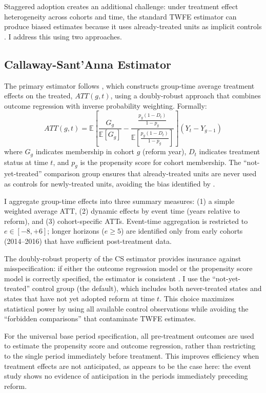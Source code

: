\documentclass[12pt]{article}
\newcommand{\E}{\mathbb{E}}
\begin{document}
Staggered adoption creates an additional challenge: under treatment effect heterogeneity across cohorts and time, the standard TWFE estimator can produce biased estimates because it uses already-treated units as implicit controls \citep{goodman2021difference, dechaisemartin2020twoway, sun2021estimating, roth2023pretrends}. I address this using two approaches.

\subsection{Callaway-Sant'Anna Estimator}

The primary estimator follows \citet{callaway2021difference}, which constructs group-time average treatment effects on the treated, $ATT(g,t)$, using a doubly-robust approach that combines outcome regression with inverse probability weighting. Formally:
\begin{equation}
ATT(g,t) = \E\left[\frac{G_g}{\E[G_g]} - \frac{\frac{p_g(1-D_t)}{1-p_g}}{\E\left[\frac{p_g(1-D_t)}{1-p_g}\right]}\right]\left(Y_t - Y_{g-1}\right)
\label{eq:cs}
\end{equation}
where $G_g$ indicates membership in cohort $g$ (reform year), $D_t$ indicates treatment status at time $t$, and $p_g$ is the propensity score for cohort membership. The ``not-yet-treated'' comparison group ensures that already-treated units are never used as controls for newly-treated units, avoiding the bias identified by \citet{goodman2021difference}.

I aggregate group-time effects into three summary measures: (1) a simple weighted average ATT, (2) dynamic effects by event time (years relative to reform), and (3) cohort-specific ATTs. Event-time aggregation is restricted to $e \in [-8, +6]$; longer horizons ($e \geq 5$) are identified only from early cohorts (2014--2016) that have sufficient post-treatment data.

The doubly-robust property of the CS estimator provides insurance against misspecification: if either the outcome regression model or the propensity score model is correctly specified, the estimator is consistent \citep{callaway2021difference}. I use the ``not-yet-treated'' control group (the default), which includes both never-treated states and states that have not yet adopted reform at time $t$. This choice maximizes statistical power by using all available control observations while avoiding the ``forbidden comparisons'' that contaminate TWFE estimates.

For the universal base period specification, all pre-treatment outcomes are used to estimate the propensity score and outcome regression, rather than restricting to the single period immediately before treatment. This improves efficiency when treatment effects are not anticipated, as appears to be the case here: the event study shows no evidence of anticipation in the periods immediately preceding reform.
\end{document}
